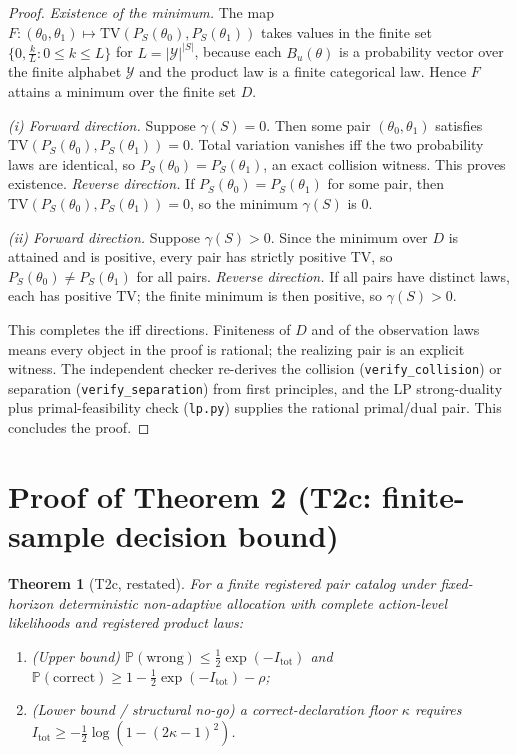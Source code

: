 \documentclass[11pt]{article}
\newtheorem{theorem}{Theorem}
\begin{document}
\begin{proof}
\emph{Existence of the minimum.} The map $F:(\theta_0,\theta_1)\mapsto\mathrm{TV}(P_S(\theta_0),P_S(\theta_1))$
takes values in the finite set $\{0,\tfrac{k}{L}:0\le k\le L\}$ for $L=|\mathcal{Y}|^{|S|}$, because each
$B_u(\theta)$ is a probability vector over the finite alphabet $\mathcal{Y}$ and the product law is a
finite categorical law. Hence $F$ attains a minimum over the finite set $D$.

\emph{(i) Forward direction.} Suppose $\gamma(S)=0$. Then some pair $(\theta_0,\theta_1)$ satisfies
$\mathrm{TV}(P_S(\theta_0),P_S(\theta_1))=0$. Total variation vanishes iff the two probability laws are
identical, so $P_S(\theta_0)=P_S(\theta_1)$, an exact collision witness. This proves existence.
\emph{Reverse direction.} If $P_S(\theta_0)=P_S(\theta_1)$ for some pair, then
$\mathrm{TV}(P_S(\theta_0),P_S(\theta_1))=0$, so the minimum $\gamma(S)$ is $0$.

\emph{(ii) Forward direction.} Suppose $\gamma(S)>0$. Since the minimum over $D$ is attained and is
positive, every pair has strictly positive TV, so $P_S(\theta_0)\neq P_S(\theta_1)$ for all pairs.
\emph{Reverse direction.} If all pairs have distinct laws, each has positive TV; the finite minimum is
then positive, so $\gamma(S)>0$.

This completes the iff directions. Finiteness of $D$ and of the observation laws means every object in
the proof is rational; the realizing pair is an explicit witness. The independent checker re-derives the
collision (\texttt{verify\_collision}) or separation (\texttt{verify\_separation}) from first
principles, and the LP strong-duality plus primal-feasibility check (\texttt{lp.py}) supplies the
rational primal/dual pair. This concludes the proof.
\end{proof}

\section{Proof of Theorem 2 (T2c: finite-sample decision bound)}\label{sec:proof-t2c}

\begin{theorem}[T2c, restated]
For a finite registered pair catalog under fixed-horizon deterministic non-adaptive allocation with
complete action-level likelihoods and registered product laws:
\begin{enumerate}
  \item (Upper bound) $\mathbb{P}(\mathrm{wrong})\le\tfrac12\exp(-I_{\mathrm{tot}})$ and
        $\mathbb{P}(\mathrm{correct})\ge 1-\tfrac12\exp(-I_{\mathrm{tot}})-\rho$;
  \item (Lower bound / structural no-go) a correct-declaration floor $\kappa$ requires
        $I_{\mathrm{tot}}\ge -\tfrac12\log(1-(2\kappa-1)^2)$.
\end{enumerate}
\end{theorem}
\end{document}

